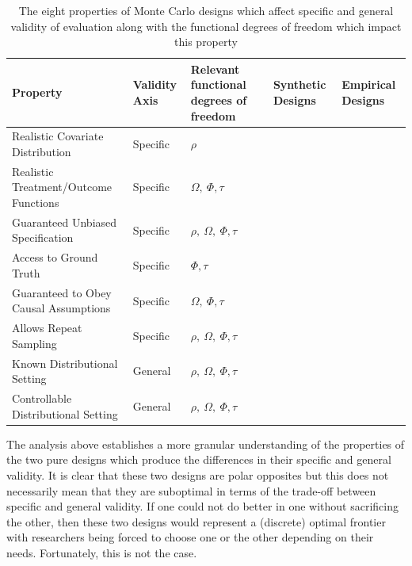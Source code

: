 \documentclass[../main.tex]{subfiles}
\begin{document}
\begin{table}[H]
\centering
\begin{tabular}{|p{2in}|p{0.5in}|p{0.7in}|p{0.6in}|p{0.6in}|}
\hline
\textbf{Property} & \textbf{Validity Axis} & \textbf{Relevant functional degrees of freedom} & \textbf{Synthetic Designs} & \textbf{Empirical Designs} \\ \hline
Realistic Covariate Distribution      & Specific      & $\rho$                                       & \cellcolor[HTML]{F4CCCC} & \cellcolor[HTML]{D9EAD3} \\ \hline
Realistic Treatment/Outcome Functions & Specific      &   $\Omega, ~\Phi, \tau$                                      & \cellcolor[HTML]{F4CCCC} & \cellcolor[HTML]{D9EAD3} \\ \hline
Guaranteed Unbiased Specification     & Specific      &    $\rho, ~\Omega, ~\Phi, \tau$                                     & \cellcolor[HTML]{F4CCCC} & \cellcolor[HTML]{D9EAD3} \\ \hline
Access to Ground Truth                & Specific      &    $\Phi, \tau$                                     & \cellcolor[HTML]{D9EAD3} & \cellcolor[HTML]{F4CCCC} \\ \hline
Guaranteed to Obey Causal Assumptions & Specific      &    $\Omega, ~\Phi, \tau$                                     & \cellcolor[HTML]{D9EAD3} & \cellcolor[HTML]{F4CCCC} \\ \hline
Allows Repeat Sampling                & Specific      &    $\rho, ~\Omega, ~\Phi, \tau$                                     & \cellcolor[HTML]{D9EAD3} & \cellcolor[HTML]{F4CCCC} \\ \hline
Known Distributional Setting          & General       &   $\rho, ~\Omega, ~\Phi, \tau$                                      & \cellcolor[HTML]{D9EAD3} & \cellcolor[HTML]{F4CCCC} \\ \hline
Controllable Distributional Setting   & General       &   $\rho, ~\Omega, ~\Phi, \tau$                                      & \cellcolor[HTML]{D9EAD3} & \cellcolor[HTML]{F4CCCC} \\ \hline
\end{tabular}
\caption{The eight properties of Monte Carlo designs which affect specific and general validity of evaluation along with the functional degrees of freedom which impact this property}
\label{tbl:synth-vs-emp-props}
\end{table}

The analysis above establishes a more granular understanding of the properties of the two pure designs which produce the differences in their specific and general validity. It is clear that these two designs are polar opposites but this does not necessarily mean that they are suboptimal in terms of the trade-off between specific and general validity. If one could not do better in one without sacrificing the other, then these two designs would represent a (discrete) optimal frontier with researchers being forced to choose one or the other depending on their needs. Fortunately, this is not the case.
\end{document}
